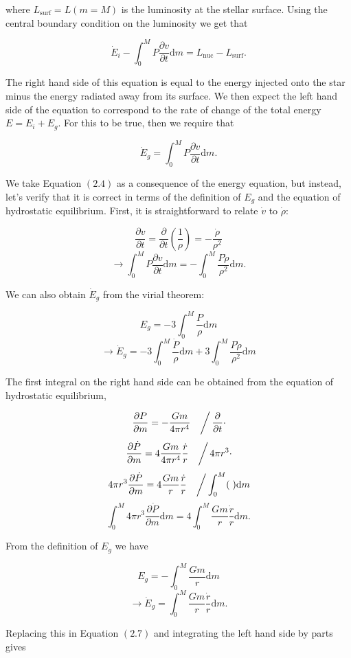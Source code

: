 \documentclass[twocolumn]{article}
\begin{document}
where \(L_\mathrm{surf}=L(m=M)\) is the luminosity at the stellar
surface. Using the central boundary condition on the luminosity we get
that

\[\dot{E}_i-\int_0^M P\frac{\partial v}{\partial t}\mathrm{d}m = L_\mathrm{nuc}-L_\mathrm{surf}.\]

The right hand side of this equation is equal to the energy injected
onto the star minus the energy radiated away from its surface. We then
expect the left hand side of the equation to correspond to the rate of
change of the total energy \(E=E_i+E_g\). For this to be true, then we
require that

\[\dot{E}_g = \int_0^MP\frac{\partial v}{\partial t}\mathrm{d}m. \tag{2.4}\]

We take Equation \((2.4)\) as a consequence of the energy equation, but
instead, let's verify that it is correct in terms of the definition of
\(E_g\) and the equation of hydrostatic equilibrium. First, it is
straightforward to relate \(\dot{v}\) to \(\dot{\rho}\):

\[\frac{\partial v}{\partial t}=\frac{\partial}{\partial t}\left(\frac{1}{\rho}\right)=-\frac{\dot{\rho}}{\rho^2}\]
\[\rightarrow \int_0^M P\frac{\partial v}{\partial t}\mathrm{d}m = -\int_0^M \frac{P\dot{\rho}}{\rho^2}\mathrm{d}m.\tag{2.5}\]

We can also obtain \(\dot{E}_g\) from the virial theorem:

\[E_g=-3\int_0^M\frac{P}{\rho}\mathrm{d}m\]
\[\rightarrow\dot{E}_g=-3\int_0^M\frac{\dot{P}}{\rho}\mathrm{d}m + 3\int_0^M\frac{P\dot{\rho}}{\rho^2}\mathrm{d}m \tag{2.6}\]

The first integral on the right hand side can be obtained from the
equation of hydrostatic equilibrium,

\[\left.\frac{\partial P}{\partial m}=-\frac{Gm}{4\pi r^4}\quad\right/\frac{\partial}{\partial t}\cdot\]
\[\left.\frac{\partial \dot{P}}{\partial m}=4\frac{Gm}{4\pi r^4}\frac{\dot{r}}{r}\quad\right/4\pi r^3\cdot\]
\[\left.4\pi r^3 \frac{\partial \dot{P}}{\partial m}=4\frac{Gm}{r}\frac{\dot{r}}{r}\quad\right/\int_0^M(\;)\mathrm{d}m\]
\[\int_0^M 4\pi r^3 \frac{\partial \dot{P}}{\partial m}\mathrm{d}m=4\int_0^M\frac{Gm}{r}\frac{\dot{r}}{r}\mathrm{d}m.\tag{2.7}\]

From the definition of \(E_g\) we have

\[E_g=-\int_0^M\frac{Gm}{r}\mathrm{d}m\]
\[\rightarrow \dot{E}_g=\int_0^M \frac{Gm}{r}\frac{\dot{r}}{r}\mathrm{d}m.\]

Replacing this in Equation \((2.7)\) and integrating the left hand side
by parts gives
\end{document}
